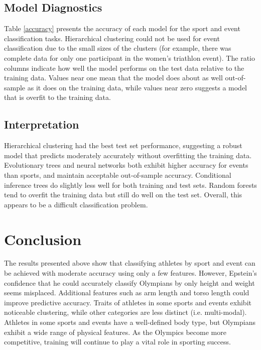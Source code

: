 \documentclass[12pt,letterpaper]{article} %
\begin{document}



\subsection{Model Diagnostics}
\label{diagnostics}

Table \ref{accuracy} presents the accuracy of each model for the sport and event classification tasks. Hierarchical clustering could not be used for event classification due to the small sizes of the clusters (for example, there was complete data for only one participant in the women's triathlon event). The ratio columns indicate how well the model performs on the test data relative to the training data. Values near one mean that the model does about as well out-of-sample as it does on the training data, while values near zero suggests a model that is overfit to the training data.



\subsection{Interpretation}

Hierarchical clustering had the best test set performance, suggesting a robust model that predicts moderately accurately without overfitting the training data. Evolutionary trees and neural networks both exhibit higher accuracy for events than sports, and maintain acceptable out-of-sample accuracy. Conditional inference trees do slightly less well for both training and test sets. Random forests tend to overfit the training data but still do well on the test set. Overall, this appears to be a difficult classification problem.



\section{Conclusion}

The results presented above show that classifying athletes by sport and event can be achieved with moderate accuracy using only a few features. However, Epstein's confidence that he could accurately classify Olympians by only height and weight seems misplaced. Additional features such as arm length and torso length could improve predictive accuracy. Traits of athletes in some sports and events exhibit noticeable clustering, while other categories are less distinct (i.e. multi-modal). Athletes in some sports and events have a well-defined body type, but Olympians exhibit a wide range of physical features. As the Olympics become more competitive, training will continue to play a vital role in sporting success.
\end{document}
